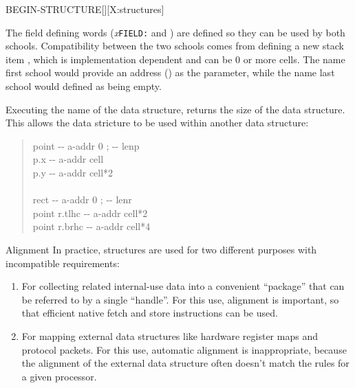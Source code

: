 \begin{worddef}{}{BEGIN-STRUCTURE}[][X:structures]
\begin{defer}
		The field defining words (\emph{x}\texttt{FIELD:} and
		) are defined so they can be used by both
		schools.  Compatibility between the two schools comes from
		defining a new stack item , which is
		implementation dependent and can be 0 or more cells.
		The name first school would provide an address ()
		as the  parameter, while the name last
		school would defined  as being empty.

		Executing the name of the data structure, returns the size of
		the data structure.  This allows the data stricture to be used
		within another data structure:

		\begin{quote}\ttfamily
		 point \tab[-0.1]  -{}- a-addr 0 ; -{}- lenp \\
		\tab {} p.x		\tab[5.5]  -{}- a-addr cell \\
		\tab {} p.y      \tab[5.5]  -{}- a-addr cell*2 \\
		 \\

		 rect  \tab[1.3] -{}- a-addr 0 ; -{}- lenr \\
		\tab point  r.tlhc   \tab {} -{}- a-addr cell*2 \\
		\tab point  r.brhc   \tab {} -{}- a-addr cell*4 \\
		\end{quote}

	\item[Alignment]
		In practice, structures are used for two different purposes
		with incompatible requirements:
		\begin{enumerate}
		\item For collecting related internal-use data into a
			convenient ``package'' that can be referred to by a
			single ``handle''. For this use, alignment is important,
			so that efficient native fetch and store instructions
			can be used.

		\item For mapping external data structures like hardware
			register maps and protocol packets. For this use,
			automatic alignment is inappropriate, because the
			alignment of the external data structure often doesn't
			match the rules for a given processor.
		\end{enumerate}


\end{defer}
\end{worddef}
